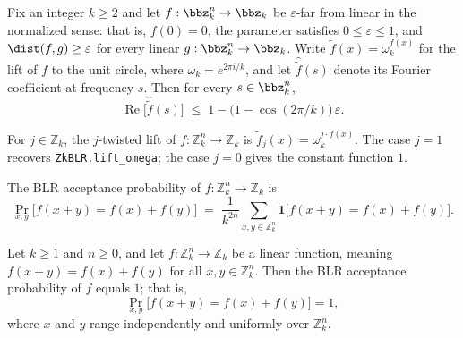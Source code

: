 \begin{lemma}
\label{ZkBLR.re_epsilon_far_bounds_fourier}
\leanok
{}
Fix an integer $k \ge 2$ and let $f : \bbz_k^n \to \bbz_k$ be $\varepsilon$-far from
linear in the normalized sense: that is, $f(0) = 0$, the parameter satisfies $0 \le
\varepsilon \le 1$, and $\dist(f, g) \ge \varepsilon$ for every linear $g : \bbz_k^n \to
\bbz_k$. Write $\widetilde{f}(x) = \omega_k^{f(x)}$ for the lift of $f$ to the unit
circle, where $\omega_k = e^{2\pi i/k}$, and let $\widehat{\widetilde{f}}(s)$ denote its
Fourier coefficient at frequency $s$. Then for every $s \in \bbz_k^n$,
\[
  \operatorname{Re}\bigl[\widehat{\widetilde{f}}(s)\bigr]
  \;\le\; 1 - \bigl(1 - \cos(2\pi/k)\bigr)\,\varepsilon.
\]
\end{lemma}

\begin{definition}
\label{ZkBLR.lift_omega_j}
\leanok
{}
For $j \in \mathbb{Z}_k$, the $j$-twisted lift of
$f : \mathbb{Z}_k^n \to \mathbb{Z}_k$ is
$\widetilde{f}_j(x) = \omega_k^{j \cdot f(x)}$.
The case $j=1$ recovers \texttt{ZkBLR.lift\_omega}; the case $j=0$ gives the
constant function $1$.
\end{definition}

\begin{definition}
\label{ZkBLR.BLR_accept_prob}
\leanok
{}
The BLR acceptance probability of $f : \mathbb{Z}_k^n \to \mathbb{Z}_k$ is
\[
  \Pr_{x,y}\bigl[f(x+y) = f(x)+f(y)\bigr]
  \;=\; \frac{1}{k^{2n}}
    \sum_{x,y\in\mathbb{Z}_k^n}
    \mathbf{1}\bigl[f(x+y)=f(x)+f(y)\bigr].
\]
\end{definition}

\begin{lemma}
\label{ZkBLR.BLR_completeness}
\leanok
{}
Let $k \ge 1$ and $n \ge 0$, and let $f : \mathbb{Z}_k^n \to \mathbb{Z}_k$ be a linear
function, meaning $f(x+y) = f(x) + f(y)$ for all $x, y \in \mathbb{Z}_k^n$. Then the BLR
acceptance probability of $f$ equals $1$; that is,
\[
  \Pr_{x,y}\bigl[f(x+y) = f(x) + f(y)\bigr] = 1,
\]
where $x$ and $y$ range independently and uniformly over $\mathbb{Z}_k^n$.
\end{lemma}

